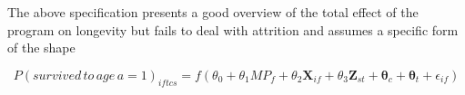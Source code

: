 The above specification presents a good overview of the total effect of the program on longevity but fails to deal with attrition and assumes a specific form of the shape

$$
P(survived\,to\,age\,a=1)_{iftcs} = f(\theta_0 + \theta_1MP_f + \theta_2\mathbf{X}_{if} + \theta_3\mathbf{Z}_{st} + \mathbf{\theta}_c + \mathbf{\theta}_t + \epsilon_{if})
$$